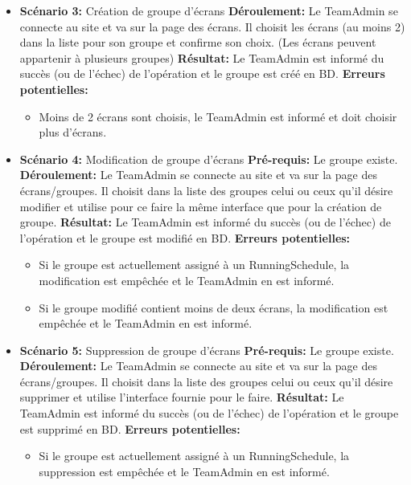 \documentclass[french]{article}
\begin{document}
\begin{appendices}
\begin{itemize}
		\item \textbf{Scénario 3:} Création de groupe d'écrans\newline
			\textbf{Déroulement:} Le TeamAdmin se connecte au site et va sur la page des écrans. Il choisit les écrans (au moins 2) dans la liste pour son groupe et confirme son choix. (Les écrans peuvent appartenir à plusieurs groupes) \newline
			\textbf{Résultat:} Le TeamAdmin est informé du succès (ou de l'échec) de l'opération et le groupe est créé en BD.\newline	
			\textbf{Erreurs potentielles:} 
			\begin{itemize}
				\item Moins de 2 écrans sont choisis, le TeamAdmin est informé et doit choisir plus d'écrans.\newline
			\end{itemize}
			
		\item \textbf{Scénario 4:} Modification de groupe d'écrans\newline
			\textbf{Pré-requis:} Le groupe existe.\newline
			\textbf{Déroulement:} Le TeamAdmin se connecte au site et va sur la page des écrans/groupes. Il choisit dans la liste des groupes celui ou ceux qu'il désire modifier et utilise pour ce faire la même interface que pour la création de groupe. \newline
			\textbf{Résultat:} Le TeamAdmin est informé du succès (ou de l'échec) de l'opération et le groupe est modifié en BD.\newline	
			\textbf{Erreurs potentielles:} 
			\begin{itemize}
				\item Si le groupe est actuellement assigné à un RunningSchedule, la modification est empêchée et le TeamAdmin en est informé.
				\item Si le groupe modifié contient moins de deux écrans, la modification est empêchée et le TeamAdmin en est informé.\newline
			\end{itemize}
			
		\item \textbf{Scénario 5:} Suppression de groupe d'écrans\newline
			\textbf{Pré-requis:} Le groupe existe.\newline
			\textbf{Déroulement:} Le TeamAdmin se connecte au site et va sur la page des écrans/groupes. Il choisit dans la liste des groupes celui ou ceux qu'il désire supprimer et utilise l'interface fournie pour le faire. \newline
			\textbf{Résultat:} Le TeamAdmin est informé du succès (ou de l'échec) de l'opération et le groupe est supprimé en BD.\newline	
			\textbf{Erreurs potentielles:} 
			\begin{itemize}
				\item Si le groupe est actuellement assigné à un RunningSchedule, la suppression est empêchée et le TeamAdmin en est informé.\newline
			\end{itemize}
		

\end{itemize}
\end{appendices}
\end{document}
